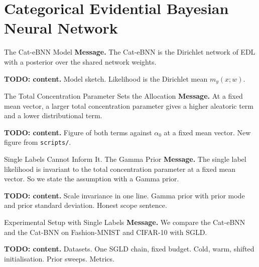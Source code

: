 
\section{Categorical Evidential Bayesian Neural Network}

\begin{frame}{The Cat-eBNN Model}
	\textbf{Message.} The Cat-eBNN is the Dirichlet network of EDL with a posterior over the shared network weights.

	\medskip
	\textbf{TODO: content.} Model sketch. Likelihood is the Dirichlet mean $m_y(x;w)$.
\end{frame}

\begin{frame}{The Total Concentration Parameter Sets the Allocation}
	\textbf{Message.} At a fixed mean vector, a larger total concentration parameter gives a higher aleatoric term and a lower distributional term.

	\medskip
	\textbf{TODO: content.} Figure of both terms against $\alpha_0$ at a fixed mean vector. New figure from \texttt{scripts/}.
\end{frame}

\begin{frame}{Single Labels Cannot Inform It. The Gamma Prior}
	\textbf{Message.} The single label likelihood is invariant to the total concentration parameter at a fixed mean vector. So we state the assumption with a Gamma prior.

	\medskip
	\textbf{TODO: content.} Scale invariance in one line. Gamma prior with prior mode and prior standard deviation. Honest scope sentence.
\end{frame}

\begin{frame}{Experimental Setup with Single Labels}
	\textbf{Message.} We compare the Cat-eBNN and the Cat-BNN on Fashion-MNIST and CIFAR-10 with SGLD.

	\medskip
	\textbf{TODO: content.} Datasets. One SGLD chain, fixed budget. Cold, warm, shifted initialisation. Prior sweeps. Metrics.
\end{frame}

